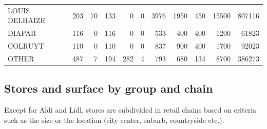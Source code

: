 \documentclass[11pt]{article}
\begin{document}
\begin{table}[H]
\begin{tabular}{lrrrrrrrrrr}
LOUIS DELHAIZE &        203 &         70 &        133 &          0 &          0 &       3976 &       1950 &        450 &      15500 &     807116 \\
DIAPAR         &        116 &          0 &        116 &          0 &          0 &        533 &        400 &        400 &       1200 &      61823 \\
COLRUYT        &        110 &          0 &        110 &          0 &          0 &        837 &        900 &        400 &       1700 &      92023 \\
OTHER          &        487 &          7 &        194 &        282 &          4 &        793 &        680 &        134 &       8700 &     386273 \\
\bottomrule
\end{tabular}
\end{table}

\subsection{Stores and surface by group and chain}

Except for Aldi and Lidl, stores are subdivided in retail chains based on criteria such as the size or the location (city center, suburb, countryside etc.).
\end{document}
